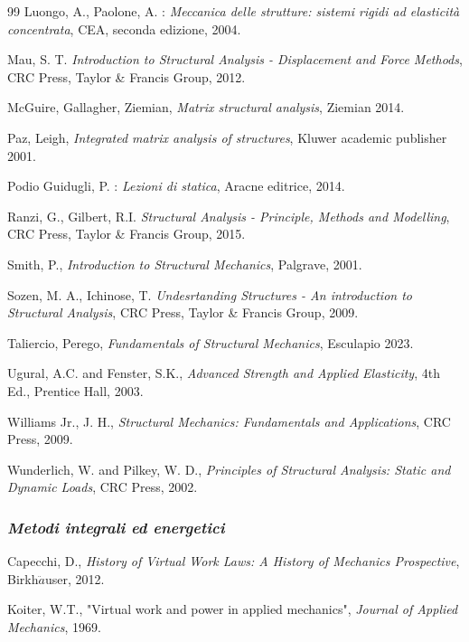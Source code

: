 \begin{thebibliography}{99}
Luongo, A., Paolone, A. : {\em Meccanica delle strutture: sistemi
	rigidi ad elasticit\`{a} concentrata}, CEA, seconda edizione,
2004.

Mau, S. T. {\em Introduction to Structural Analysis - Displacement and Force Methods}, CRC Press, Taylor \& Francis Group, 2012.

McGuire, Gallagher, Ziemian, {\em Matrix structural analysis}, Ziemian 2014.

Paz, Leigh, {\em Integrated matrix analysis of structures}, Kluwer academic publisher 2001.

Podio Guidugli, P. : {\em Lezioni di statica}, Aracne editrice, 2014.

Ranzi, G., Gilbert, R.I. {\em Structural Analysis - Principle, Methods and Modelling}, CRC Press, Taylor \& Francis Group, 2015.

Smith, P., {\em Introduction to Structural Mechanics}, Palgrave, 2001.

Sozen, M. A., Ichinose, T. {\em Undesrtanding Structures - An introduction to Structural Analysis}, CRC Press, Taylor \& Francis Group, 2009.

Taliercio, Perego, {\em Fundamentals of Structural Mechanics}, Esculapio 2023.

Ugural, A.C. and Fenster, S.K., {\em Advanced Strength and Applied Elasticity}, 4th Ed., Prentice Hall, 2003.

Williams Jr., J. H., {\em Structural Mechanics: Fundamentals and Applications}, CRC Press, 2009.

Wunderlich, W. and Pilkey, W. D., {\em Principles of Structural Analysis: Static and Dynamic Loads}, CRC Press, 2002.




\vspace{0.6 cm}
\subsubsection{\emph{Metodi integrali ed energetici }}



Capecchi, D., {\em History of Virtual Work Laws: A History of Mechanics Prospective}, Birkh$\ddot{a}$user, 2012.

Koiter, W.T., "Virtual work and power in applied mechanics", {\em Journal of Applied Mechanics}, 1969.


\end{thebibliography}
